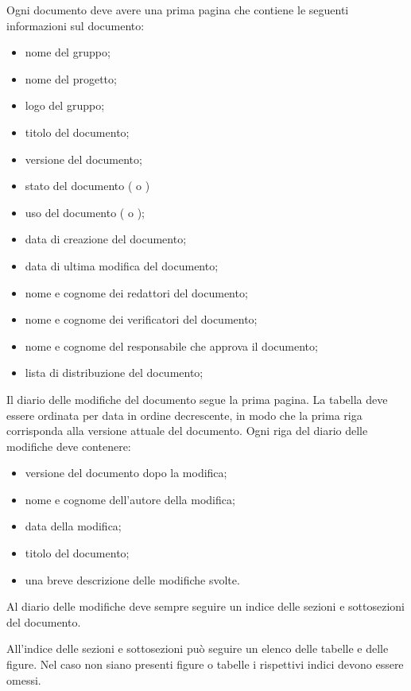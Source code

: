 \documentclass[12pt,a4paper]{article}
\begin{document}
Ogni documento deve avere una prima pagina che contiene le seguenti informazioni sul documento:
\begin{itemize}
  \item nome del gruppo;
  \item nome del progetto;
  \item logo del gruppo;
  \item titolo del documento;
  \item versione del documento;
  \item stato del documento ( o )
  \item uso del documento ( o );
  \item data di creazione del documento;
  \item data di ultima modifica del documento;
  \item nome e cognome dei redattori del documento;
  \item nome e cognome dei verificatori del documento;
  \item nome e cognome del responsabile che approva il documento;
  \item lista di distribuzione del documento;     
\end{itemize}

Il diario delle modifiche del documento segue la prima pagina. La tabella deve essere ordinata per data in ordine decrescente, in modo che la prima riga corrisponda alla versione attuale del documento. Ogni riga del diario delle modifiche deve contenere:
\begin{itemize}
  \item versione del documento dopo la modifica;
  \item nome e cognome dell'autore della modifica;
  \item data della modifica;
  \item titolo del documento;
  \item una breve descrizione delle modifiche svolte.
\end{itemize}

Al diario delle modifiche deve sempre seguire un indice delle sezioni e sottosezioni del documento.

All'indice delle sezioni e sottosezioni può seguire un elenco delle tabelle e delle figure. Nel caso non siano presenti figure o tabelle i rispettivi indici devono essere omessi.
\end{document}
